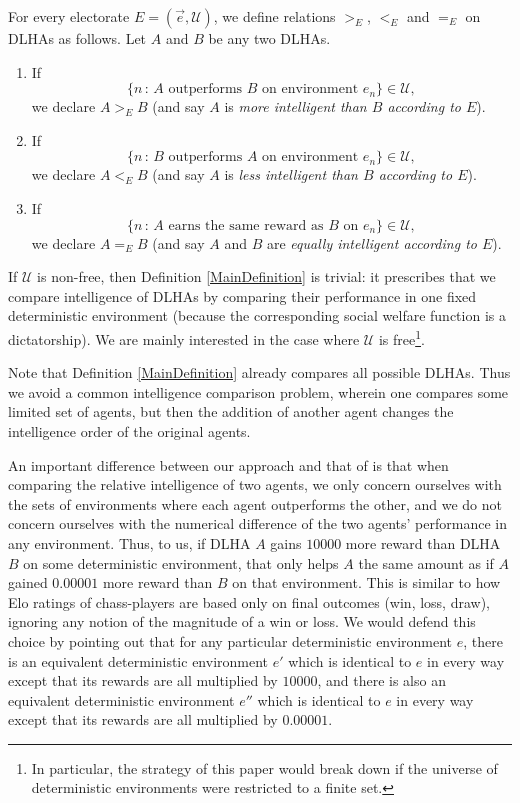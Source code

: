 \documentclass[twoside,11pt]{article}
\begin{document}
\begin{definition}
\label{MainDefinition}
    For every electorate $E=(\vec{e},\mathscr U)$,
    we define relations $>_{E}$, $<_{E}$ and $=_{E}$ on DLHAs as follows.
    Let $A$ and $B$ be any two DLHAs.
    \begin{enumerate}
        \item
        If
        \[
            \{n\,:\,\mbox{$A$ outperforms $B$ on environment $e_n$}\}\in\mathscr U,
        \]
        we declare $A>_{E}B$
        (and say $A$ is \emph{more intelligent than $B$ according to $E$}).
        \item
        If
        \[
            \{n\,:\,\mbox{$B$ outperforms $A$ on environment $e_n$}\}\in\mathscr U,
        \]
        we declare $A<_{E}B$
        (and say $A$ is \emph{less intelligent than $B$ according to $E$}).
        \item
        If
        \[
            \{n\,:\,\mbox{$A$ earns the same reward as $B$ on $e_n$}\}\in\mathscr U,
        \]
        we declare $A=_{E}B$
        (and say $A$ and $B$ are \emph{equally intelligent according to $E$}).
    \end{enumerate}
\end{definition}

If $\mathscr U$ is non-free, then Definition \ref{MainDefinition} is trivial:
it prescribes that we compare intelligence of DLHAs by comparing their
performance in one fixed deterministic environment (because the corresponding social welfare
function is a dictatorship). We are mainly interested in the case where $\mathscr U$
is free\footnote{In particular, the strategy of this paper would break
down if the universe of deterministic environments were restricted to a finite set.}.

Note that Definition \ref{MainDefinition} already compares all possible DLHAs.
Thus we avoid a common intelligence comparison problem, wherein one compares some
limited set of agents, but then the addition of another agent changes the
intelligence order of the original agents.

An important difference between our approach and that of \citet{hutter2007}
is that when comparing the relative intelligence of two agents, we only concern ourselves
with the sets of environments where each agent outperforms the other, and we do not
concern ourselves with the numerical difference of the two agents' performance in any
environment. Thus, to us, if DLHA $A$ gains $10000$ more reward than DLHA $B$ on some
deterministic environment, that only helps $A$ the same amount as
if $A$ gained $0.00001$ more reward
than $B$ on that environment.
This is similar to how Elo ratings of chass-players
are based only on final outcomes (win, loss, draw),
ignoring any notion of the magnitude of a win or loss.
We would defend this choice by pointing out that for any
particular deterministic environment $e$, there is an
equivalent deterministic environment $e'$ which is identical to
$e$ in every way except that its rewards are all multiplied by $10000$, and there is also
an equivalent deterministic environment $e''$ which is
identical to $e$ in every way except that its
rewards are all multiplied by $0.00001$.
\end{document}
